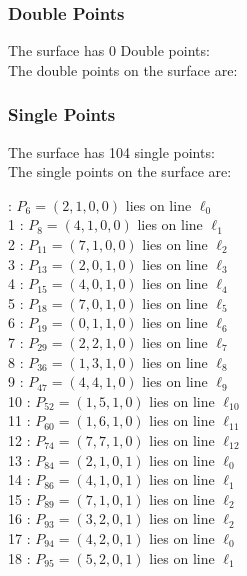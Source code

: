 \documentclass{article}
\begin{document}
{\subsubsection*{Double Points}
The surface has 0 Double points:\\
The double points on the surface are:\\
\begin{multicols}{2}
\noindent
\end{multicols}
\subsubsection*{Single Points}
The surface has 104 single points:\\
The single points on the surface are:\\
\begin{multicols}{2}
 : $P_{6}=( 2, 1, 0, 0 )$ lies on line $\ell_{0}$\\
1 : $P_{8}=( 4, 1, 0, 0 )$ lies on line $\ell_{1}$\\
2 : $P_{11}=( 7, 1, 0, 0 )$ lies on line $\ell_{2}$\\
3 : $P_{13}=( 2, 0, 1, 0 )$ lies on line $\ell_{3}$\\
4 : $P_{15}=( 4, 0, 1, 0 )$ lies on line $\ell_{4}$\\
5 : $P_{18}=( 7, 0, 1, 0 )$ lies on line $\ell_{5}$\\
6 : $P_{19}=( 0, 1, 1, 0 )$ lies on line $\ell_{6}$\\
7 : $P_{29}=( 2, 2, 1, 0 )$ lies on line $\ell_{7}$\\
8 : $P_{36}=( 1, 3, 1, 0 )$ lies on line $\ell_{8}$\\
9 : $P_{47}=( 4, 4, 1, 0 )$ lies on line $\ell_{9}$\\
10 : $P_{52}=( 1, 5, 1, 0 )$ lies on line $\ell_{10}$\\
11 : $P_{60}=( 1, 6, 1, 0 )$ lies on line $\ell_{11}$\\
12 : $P_{74}=( 7, 7, 1, 0 )$ lies on line $\ell_{12}$\\
13 : $P_{84}=( 2, 1, 0, 1 )$ lies on line $\ell_{0}$\\
14 : $P_{86}=( 4, 1, 0, 1 )$ lies on line $\ell_{1}$\\
15 : $P_{89}=( 7, 1, 0, 1 )$ lies on line $\ell_{2}$\\
16 : $P_{93}=( 3, 2, 0, 1 )$ lies on line $\ell_{2}$\\
17 : $P_{94}=( 4, 2, 0, 1 )$ lies on line $\ell_{0}$\\
18 : $P_{95}=( 5, 2, 0, 1 )$ lies on line $\ell_{1}$\\

\end{multicols}}
\end{document}
